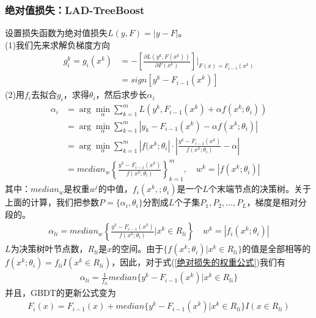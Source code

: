           \subsubsection{绝对值损失：LAD-TreeBoost}
              \par
              设置损失函数为绝对值损失$L(y,F) = |y-F|$。\\
              (1)我们先来求解负梯度方向
              \begin{align*}
              g_i^k = g_i(x^k) & = -\left[\frac{\partial L(y^k,F(x^k))}{\partial F(x^k)}  \right]\bigg|_{F(x) = F_{i-1}(x^k)}\\
              & =sign[y^k - F_{i-1}(x^k)]
              \end{align*}
              (2)用$f_i$去拟合$g_i$，求得$\theta_i$，然后求步长$\alpha_i$
              \begin{align*}
              \alpha_i  &=\arg\min_\alpha \sum_{k=1}^m L(y^k ,F_{i-1}(x^k)+\alpha f(x^k;\theta_i))\\
              &=\arg\min_\alpha \sum_{k=1}^m |y_k - F_{i-1}(x^k)-\alpha f(x^k;\theta_i)|\\
              &=\arg\min_\alpha \sum_{k=1}^m |f(x^k;\theta_i| \cdot \left|\frac{y^k - F_{i-1}(x^k)}{f(x^k;\theta_i)}-\alpha \right|\\
              & = median_w\left\{ \frac{y^k - F_{i-1}(x^k)}{f(x^k;\theta_i)} \right\}_{k=1}^m,\quad w^k = |f(x^k;\theta_i)|
              \end{align*}
              其中：$median_w$是权重$w^i$的中值，$f_i(x^k,;\theta_i)$是一个$L$个末端节点的决策树。关于上面的计算，我们把参数$P = \{\alpha_i,\theta_i\}$分割成$L$个子集$P_1,P_2,\dots,P_L$，梯度是相对分段的。
              \begin{align}
              \label{绝对损失的权重公式}
              \alpha_{li} = median_w\left\{\frac{y^k - F_{i-1}(x^k)}{f(x^k;\theta_i)} \bigg|x^k \in R_{li}  \right\} \quad w^k = |f_i(x^k;\theta_i)|
              \end{align}
              $L$为决策树叶节点数，$R_{li}$是$x$的空间。由于$\{f(x^k;\theta_i)|x^k\in R_{li}\}$的值是全部相等的$f(x^k;\theta_i) = f_{li}I({x^k\in R_{li}})$，因此，对于式(\ref{绝对损失的权重公式})我们有
              \begin{align*}
              \alpha_{li} = \frac{1}{f_{li}}median\{y^k-F_{i-1}(x^k)|x^k\in R_{li}\}
              \end{align*}
              并且，GBDT的更新公式变为
              \begin{align*}
              F_i(x) = F_{i-1}(x)+median\{y^k-F_{i-1}(x^k)|x^k\in R_{li}\}I(x\in R_{li})
              \end{align*}
